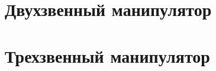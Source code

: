 \documentclass[14pt,a4paper,final,russian]{report}
\numberwithin{theorem}{chapter}
\numberwithin{lemma}{chapter}
\numberwithin{consectary}{chapter}
\numberwithin{pointout}{chapter}
\numberwithin{definition}{chapter}
\numberwithin{assertion}{chapter}
\begin{document}
\chapter{Двухзвенный манипулятор}


 

\chapter{Трехзвенный манипулятор}


 






\end{document}
